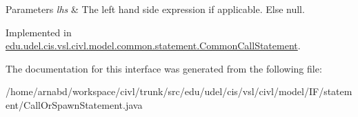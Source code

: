 \begin{DoxyParams}{Parameters}
{\em lhs} & The left hand side expression if applicable. Else null. \\
\hline
\end{DoxyParams}


Implemented in \hyperlink{classedu_1_1udel_1_1cis_1_1vsl_1_1civl_1_1model_1_1common_1_1statement_1_1CommonCallStatement_ae2531d3a489cfe84952c3cee8d9666b5}{edu.\+udel.\+cis.\+vsl.\+civl.\+model.\+common.\+statement.\+Common\+Call\+Statement}.



The documentation for this interface was generated from the following file\+:\begin{DoxyCompactItemize}
\item 
/home/arnabd/workspace/civl/trunk/src/edu/udel/cis/vsl/civl/model/\+I\+F/statement/Call\+Or\+Spawn\+Statement.\+java\end{DoxyCompactItemize}
